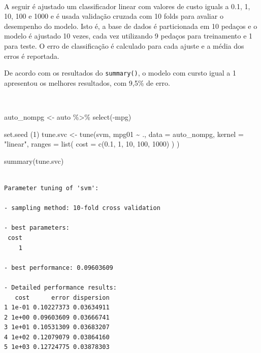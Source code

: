 \documentclass[
  a4paperpaper,
]{article}
\newenvironment{Shaded}{\begin{snugshade}}{\end{snugshade}}
\newcommand{\AttributeTok}[1]{\textcolor[rgb]{0.40,0.45,0.13}{#1}}
\newcommand{\DecValTok}[1]{\textcolor[rgb]{0.68,0.00,0.00}{#1}}
\newcommand{\FloatTok}[1]{\textcolor[rgb]{0.68,0.00,0.00}{#1}}
\newcommand{\FunctionTok}[1]{\textcolor[rgb]{0.28,0.35,0.67}{#1}}
\newcommand{\NormalTok}[1]{\textcolor[rgb]{0.00,0.23,0.31}{#1}}
\newcommand{\OtherTok}[1]{\textcolor[rgb]{0.00,0.23,0.31}{#1}}
\newcommand{\SpecialCharTok}[1]{\textcolor[rgb]{0.37,0.37,0.37}{#1}}
\newcommand{\StringTok}[1]{\textcolor[rgb]{0.13,0.47,0.30}{#1}}
\begin{document}
~

A seguir é ajustado um classificador linear com valores de custo iguals
a 0.1, 1, 10, 100 e 1000 e é usada validação cruzada com 10 folds para
avaliar o desempenho do modelo. Isto é, a base de dados é particionada
em 10 pedaços e o modelo é ajustado 10 vezes, cada vez utilizando 9
pedaços para treinamento e 1 para teste. O erro de classificação é
calculado para cada ajuste e a média dos erros é reportada.

De acordo com os resultados do \texttt{summary()}, o modelo com cursto
igual a 1 apresentou os melhores resultados, com 9,5\% de erro.

~

\begin{Shaded}
\begin{Highlighting}[]
\NormalTok{auto\_nompg }\OtherTok{\textless{}{-}}\NormalTok{ auto }\SpecialCharTok{\%\textgreater{}\%} \FunctionTok{select}\NormalTok{(}\SpecialCharTok{{-}}\NormalTok{mpg)}

\FunctionTok{set.seed}\NormalTok{ (}\DecValTok{1}\NormalTok{)}
\NormalTok{tune.svc }\OtherTok{\textless{}{-}} \FunctionTok{tune}\NormalTok{(svm, mpg01 }\SpecialCharTok{\textasciitilde{}}\NormalTok{ ., }\AttributeTok{data =}\NormalTok{ auto\_nompg,}
                   \AttributeTok{kernel =} \StringTok{"linear"}\NormalTok{,}
                   \AttributeTok{ranges =} \FunctionTok{list}\NormalTok{(}
                     \AttributeTok{cost =} \FunctionTok{c}\NormalTok{(}\FloatTok{0.1}\NormalTok{, }\DecValTok{1}\NormalTok{, }\DecValTok{10}\NormalTok{, }\DecValTok{100}\NormalTok{, }\DecValTok{1000}\NormalTok{)}
\NormalTok{                   )}
\NormalTok{)}

\FunctionTok{summary}\NormalTok{(tune.svc)}
\end{Highlighting}
\end{Shaded}

\begin{verbatim}

Parameter tuning of 'svm':

- sampling method: 10-fold cross validation 

- best parameters:
 cost
    1

- best performance: 0.09603609 

- Detailed performance results:
   cost      error dispersion
1 1e-01 0.10227373 0.03634911
2 1e+00 0.09603609 0.03666741
3 1e+01 0.10531309 0.03683207
4 1e+02 0.12079079 0.03864160
5 1e+03 0.12724775 0.03878303
\end{verbatim}
\end{document}
